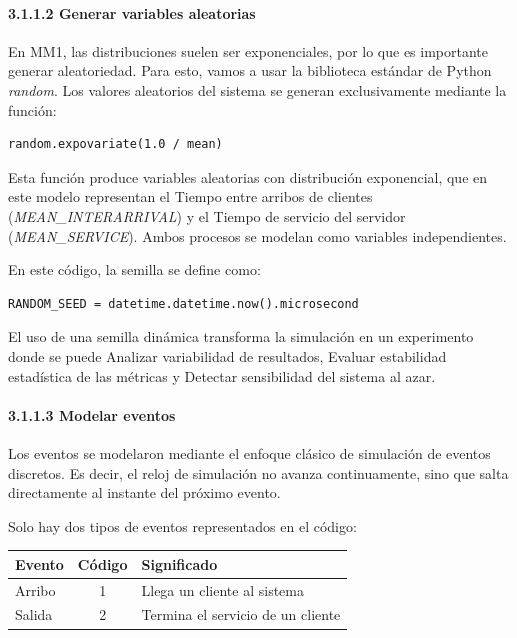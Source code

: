 \documentclass{article}
\begin{document}
\paragraph{3.1.1.2 Generar variables aleatorias}
En MM1, las distribuciones suelen ser exponenciales, por lo que es importante generar aleatoriedad. Para esto, vamos a usar la biblioteca estándar de Python \textit{random}. Los valores aleatorios del sistema se generan exclusivamente mediante la función:

\begin{verbatim}
random.expovariate(1.0 / mean)
\end{verbatim}

Esta función produce variables aleatorias con distribución exponencial, que en este modelo representan el Tiempo entre arribos de clientes (\textit{MEAN\_INTERARRIVAL}) y el Tiempo de servicio del servidor (\textit{MEAN\_SERVICE}). Ambos procesos se modelan como variables independientes.

En este código, la semilla se define como:
\begin{verbatim}
RANDOM_SEED = datetime.datetime.now().microsecond
\end{verbatim}

El uso de una semilla dinámica transforma la simulación en un experimento donde se puede Analizar variabilidad de resultados, Evaluar estabilidad estadística de las métricas y Detectar sensibilidad del sistema al azar.

\paragraph{3.1.1.3 Modelar eventos}
Los eventos se modelaron mediante el enfoque clásico de simulación de eventos discretos. Es decir, el reloj de simulación no avanza continuamente, sino que salta directamente al instante del próximo evento.

Solo hay dos tipos de eventos representados en el código:
\begin{table}[h]
\centering
\begin{tabular}{|l|c|l|}
\hline
\textbf{Evento} & \textbf{Código} & \textbf{Significado} \\ \hline
Arribo & 1 & Llega un cliente al sistema \\ \hline
Salida & 2 & Termina el servicio de un cliente \\ \hline
\end{tabular}
\end{table}
\end{document}
